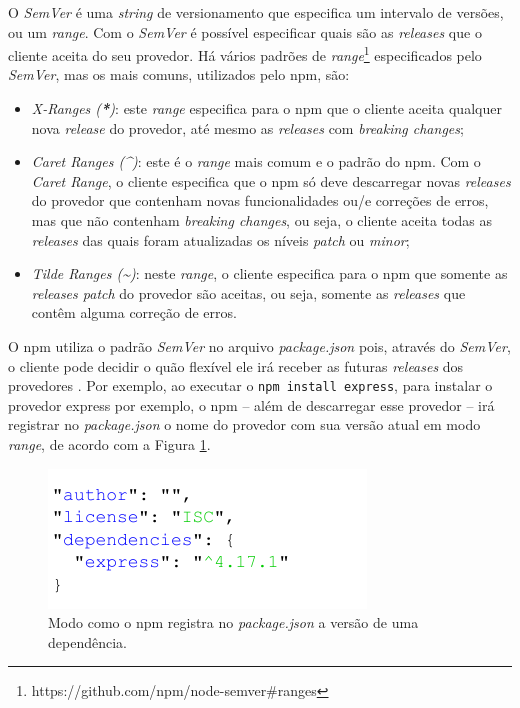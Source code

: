 O \textit{SemVer} é uma \textit{string} de versionamento que especifica um intervalo de versões, ou um \textit{range}. Com o \textit{SemVer} é possível especificar quais são as \textit{releases} que o cliente aceita do seu provedor. Há vários padrões de \textit{range}\footnote{https://github.com/npm/node-semver\#ranges} especificados pelo \textit{SemVer}, mas os mais comuns, utilizados pelo \textsf{npm}, são:

\begin{itemize}
    \item \textit{X-Ranges (\textbf{*})}: este \textit{range} especifica para o \textsf{npm} que o cliente aceita qualquer nova \textit{release} do provedor, até mesmo as \textit{releases} com \textit{breaking changes};
    \item \textit{Caret Ranges (\textbf{\textasciicircum})}: este é o \textit{range} mais comum e o padrão do \textsf{npm}. Com o \textit{Caret Range}, o cliente especifica que o \textsf{npm} só deve descarregar novas \textit{releases} do provedor que contenham novas funcionalidades ou/e correções de erros, mas que não contenham \textit{breaking changes}, ou seja, o cliente aceita todas as \textit{releases} das quais foram atualizadas os níveis \textit{patch} ou \textit{minor};
    \item \textit{Tilde Ranges (\textbf{\textasciitilde})}: neste \textit{range}, o cliente especifica para o \textsf{npm} que somente as \textit{releases patch} do provedor são aceitas, ou seja, somente as \textit{releases} que contêm alguma correção de erros.
\end{itemize}{}

O \textsf{npm} utiliza o padrão \textit{SemVer} no arquivo \textit{package.json} pois, através do \textit{SemVer}, o cliente pode decidir o quão flexível ele irá receber as futuras \textit{releases} dos provedores \cite{decan}. Por exemplo, ao executar o \texttt{npm install express}, para instalar o provedor \textsf{express} por exemplo, o \textsf{npm} -- além de descarregar esse provedor -- irá registrar no \textit{package.json} o nome do provedor com sua versão atual em modo \textit{range}, de acordo com a Figura \ref{fig:dep_express}.

\begin{figure}
    \centering
    \includegraphics[scale=1.3]{figuras/dependencies_express.pdf}
    \caption{Modo como o \textsf{npm} registra no \textit{package.json} a versão de uma dependência.}
    \label{fig:dep_express}
\end{figure}{}

